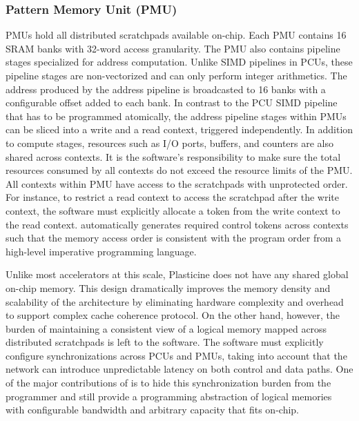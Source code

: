 \subsubsection{Pattern Memory Unit (PMU)}
PMUs hold all distributed scratchpads available on-chip. 
Each PMU contains 16 SRAM banks with
32-word access granularity. The PMU also contains pipeline stages specialized for address
computation. Unlike SIMD pipelines in PCUs, these pipeline stages are non-vectorized and can only perform integer arithmetics. 
The address produced by the address pipeline is broadcasted to 16 banks with a configurable offset added to each bank.
In contrast to the PCU SIMD pipeline that has to be programmed atomically, the address pipeline stages within PMUs can be sliced into a write and a read context, triggered independently.
In addition to compute stages, resources such as I/O ports, buffers, and counters are also shared across contexts.
It is the software's responsibility to make sure the total resources consumed by all
contexts do not exceed the resource limits of the PMU.
All contexts within PMU have access to the scratchpads with unprotected order. For instance, to
restrict a read context to access the scratchpad after the write context, the software must explicitly allocate
a token from the write context to the read context.
\name automatically generates required control tokens across contexts such that the memory access order is
consistent with the program order from a high-level imperative programming language.

Unlike most accelerators at this scale, Plasticine does not have any shared global on-chip memory. 
This design dramatically improves the memory density and scalability of the architecture 
by eliminating hardware complexity and overhead to support complex cache coherence protocol.
On the other hand, however, the burden of maintaining a consistent view of a logical memory mapped
across distributed scratchpads is left to the software.
The software must explicitly configure synchronizations across PCUs and PMUs, taking into account
that the network can introduce unpredictable latency on both control and data paths.
One of the major contributions of \name is to hide this synchronization burden from the programmer and still provide a programming abstraction of logical memories with configurable bandwidth and arbitrary capacity that fits on-chip.


